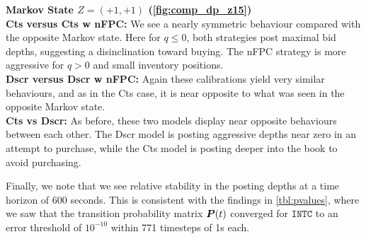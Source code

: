{\bf Markov State $Z=(+1,+1)$ (\autoref{fig:comp_dp_z15})}\\
{\bf Cts versus Cts w nFPC:} We see a nearly symmetric behaviour compared with the opposite Markov state. Here for $q \leq 0$, both strategies post maximal bid depths, suggesting a disinclination toward buying. The nFPC strategy is more aggressive for $q>0$ and small inventory positions.\\
{\bf Dscr versus Dscr w nFPC:} Again these calibrations yield very similar behaviours, and as in the Cts case, it is near opposite to what was seen in the opposite Markov state.\\
{\bf Cts vs Dscr:} As before, these two models display near opposite behaviours between each other. The Dscr model is posting aggressive depths near zero in an attempt to purchase, while the Cts model is posting deeper into the book to avoid purchasing.

Finally, we note that we see relative stability in the posting depths at a time horizon of 600 seconds. This is consistent with the findings in \autoref{tbl:pvalues}, where we saw that the transition probability matrix $\boldsymbol{P}(t)$ converged for $\texttt{INTC}$ to an error threshold of $10^{-10}$ within 771 timesteps of 1s each.

